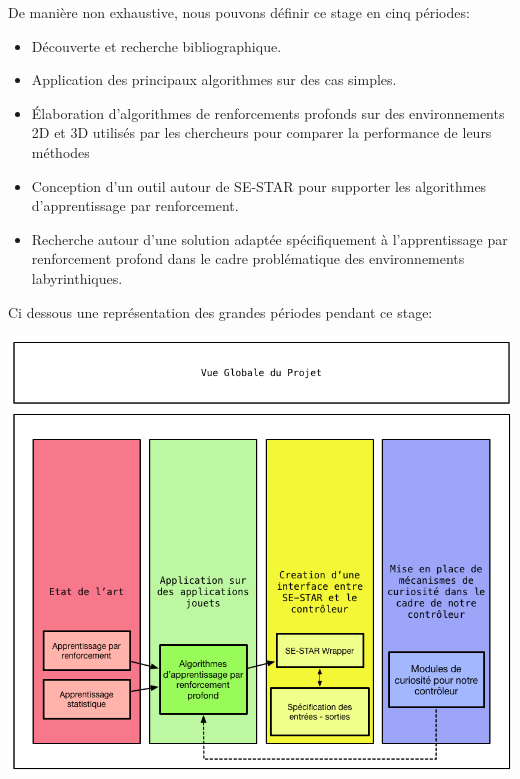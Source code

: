 De manière non exhaustive, nous pouvons définir ce stage en cinq périodes: 
\begin{itemize}
    \item Découverte et recherche bibliographique.
    \item Application des principaux algorithmes sur des cas simples.
    \item Élaboration d'algorithmes de renforcements profonds sur des environnements 2D et 3D utilisés par les chercheurs pour comparer la performance de leurs méthodes
    \item Conception d'un outil autour de SE-STAR pour supporter les algorithmes d'apprentissage par renforcement.
    \item Recherche autour d'une solution adaptée spécifiquement à l'apprentissage par renforcement profond dans le cadre problématique des environnements labyrinthiques.
\end{itemize}

Ci dessous une représentation des grandes périodes pendant ce stage:

\begin{center}
\includegraphics[scale=.5]{./assets/globale.png}
\end{center}
